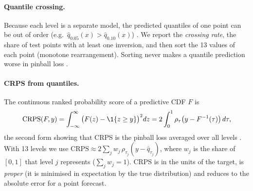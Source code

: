 \documentclass[11pt]{article}
\begin{document}
\paragraph{Quantile crossing.} Because each level is a separate model, the predicted quantiles of one point can
be out of order (e.g.\ $\hat q_{0.05}(x)>\hat q_{0.10}(x)$) \cite{chernozhukov2010rearrangement}. We report the
\emph{crossing rate}, the share of test points with at least one inversion, and then sort the 13 values of each
point (monotone rearrangement). Sorting never makes a quantile prediction worse in pinball loss
\cite{chernozhukov2010rearrangement}.

\paragraph{CRPS from quantiles.} The continuous ranked probability score of a predictive CDF $F$ is
\begin{equation}\label{eq:crps}
\mathrm{CRPS}(F,y)=\int_{-\infty}^{\infty}\big(F(z)-\1\{z\ge y\}\big)^2dz
=2\int_0^1\rho_\tau\big(y-F^{-1}(\tau)\big)\,d\tau ,
\end{equation}
the second form showing that CRPS is the pinball loss averaged over all levels \cite{gneiting2007scoring}. With 13 levels
we use $\mathrm{CRPS}\approx2\sum_jw_j\,\rho_{\tau_j}(y-\hat q_{\tau_j})$, where $w_j$ is the share of $[0,1]$ that level $j$
represents ($\sum_jw_j=1$). CRPS is in the units of the target, is \emph{proper} (it is minimised in expectation by the
true distribution) and reduces to the absolute error for a point forecast.
\end{document}
